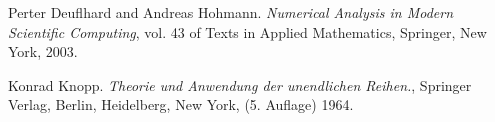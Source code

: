 \begin{thebibliography}{9}
Perter Deuflhard and Andreas Hohmann. {\it Numerical Analysis in Modern Scientific Computing}, vol. 43 of Texts in Applied Mathematics, Springer, New York, 2003. 

Konrad Knopp. {\it Theorie und Anwendung der unendlichen Reihen.}, Springer Verlag, Berlin, Heidelberg, New York, (5. Auflage) 1964. 
\end{thebibliography}